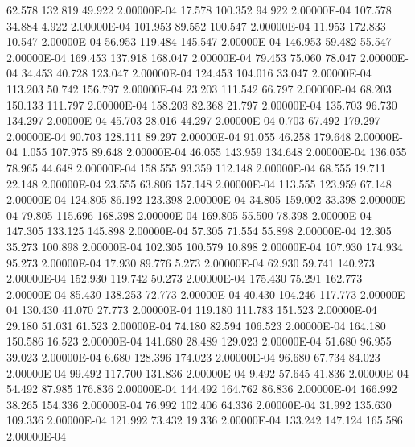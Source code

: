     62.578   132.819    49.922  2.00000E-04
    17.578   100.352    94.922  2.00000E-04
   107.578    34.884     4.922  2.00000E-04
   101.953    89.552   100.547  2.00000E-04
    11.953   172.833    10.547  2.00000E-04
    56.953   119.484   145.547  2.00000E-04
   146.953    59.482    55.547  2.00000E-04
   169.453   137.918   168.047  2.00000E-04
    79.453    75.060    78.047  2.00000E-04
    34.453    40.728   123.047  2.00000E-04
   124.453   104.016    33.047  2.00000E-04
   113.203    50.742   156.797  2.00000E-04
    23.203   111.542    66.797  2.00000E-04
    68.203   150.133   111.797  2.00000E-04
   158.203    82.368    21.797  2.00000E-04
   135.703    96.730   134.297  2.00000E-04
    45.703    28.016    44.297  2.00000E-04
     0.703    67.492   179.297  2.00000E-04
    90.703   128.111    89.297  2.00000E-04
    91.055    46.258   179.648  2.00000E-04
     1.055   107.975    89.648  2.00000E-04
    46.055   143.959   134.648  2.00000E-04
   136.055    78.965    44.648  2.00000E-04
   158.555    93.359   112.148  2.00000E-04
    68.555    19.711    22.148  2.00000E-04
    23.555    63.806   157.148  2.00000E-04
   113.555   123.959    67.148  2.00000E-04
   124.805    86.192   123.398  2.00000E-04
    34.805   159.002    33.398  2.00000E-04
    79.805   115.696   168.398  2.00000E-04
   169.805    55.500    78.398  2.00000E-04
   147.305   133.125   145.898  2.00000E-04
    57.305    71.554    55.898  2.00000E-04
    12.305    35.273   100.898  2.00000E-04
   102.305   100.579    10.898  2.00000E-04
   107.930   174.934    95.273  2.00000E-04
    17.930    89.776     5.273  2.00000E-04
    62.930    59.741   140.273  2.00000E-04
   152.930   119.742    50.273  2.00000E-04
   175.430    75.291   162.773  2.00000E-04
    85.430   138.253    72.773  2.00000E-04
    40.430   104.246   117.773  2.00000E-04
   130.430    41.070    27.773  2.00000E-04
   119.180   111.783   151.523  2.00000E-04
    29.180    51.031    61.523  2.00000E-04
    74.180    82.594   106.523  2.00000E-04
   164.180   150.586    16.523  2.00000E-04
   141.680    28.489   129.023  2.00000E-04
    51.680    96.955    39.023  2.00000E-04
     6.680   128.396   174.023  2.00000E-04
    96.680    67.734    84.023  2.00000E-04
    99.492   117.700   131.836  2.00000E-04
     9.492    57.645    41.836  2.00000E-04
    54.492    87.985   176.836  2.00000E-04
   144.492   164.762    86.836  2.00000E-04
   166.992    38.265   154.336  2.00000E-04
    76.992   102.406    64.336  2.00000E-04
    31.992   135.630   109.336  2.00000E-04
   121.992    73.432    19.336  2.00000E-04
   133.242   147.124   165.586  2.00000E-04
